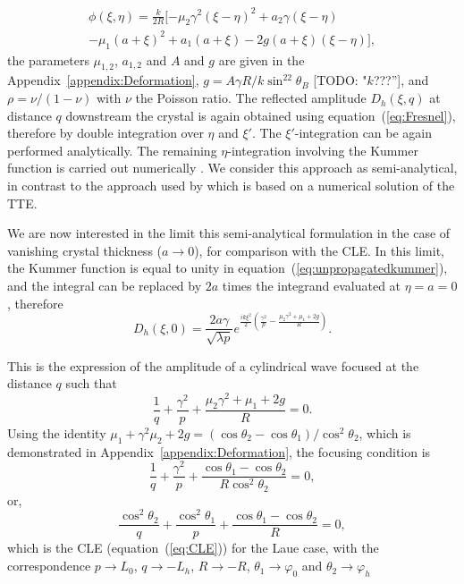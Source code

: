 \documentclass[preprint]{iucr}              %
\newcommand{\todo}[1]{{\color{red}[TODO: "#1'']}}
\newcommand{\inred}[1]{{\color{red}#1}}
\begin{document}
\begin{multline}
    \phi(\xi,\eta) =\frac{k}{2R}[-\mu_2\gamma^2(\xi-\eta)^2
    +a_2\gamma(\xi-\eta) \\
    -\mu_1(a+\xi)^2 
    +a_1(a+\xi)
    -2g(a+\xi)(\xi-\eta)],
\end{multline}
the parameters $\mu_{1,2}$, $a_{1,2}$ and $A$ \inred{and $g$} are given in the Appendix~\ref{appendix:Deformation},
\inred{$g=A\gamma R/ k \sin^22\theta_B$  \todo{$k$???}},
and $\rho=\nu/(1-\nu)$ with $\nu$ the Poisson ratio.   
The reflected amplitude $D_h(\xi,q)$ at distance $q$ downstream the crystal is again obtained using equation~(\ref{eq:Fresnel}), therefore by double integration over $\eta$ and $\xi'$. The $\xi'$-integration can be again performed analytically. The remaining $\eta$-integration involving the Kummer function is carried out numerically \cite{GuigayFerrero2016}. We consider this approach as semi-analytical, in contrast to the approach used by \cite{Nesterets} which is based on a numerical solution of the TTE.

We are now interested in the limit this \inred{semi-analytical} formulation in the case of vanishing crystal thickness ($a\rightarrow0{}$), for comparison with the CLE. In this limit, the Kummer function is equal to unity in equation~(\ref{eq:unpropagatedkummer}), and the integral can be replaced by $2a$ times the integrand evaluated at $\eta=a=0$, therefore
\begin{equation}
\label{eq:14reduced}
    D_h(\xi,0) = \frac{2 a \gamma}{\sqrt{\lambda p}} e^{\frac{i k \xi^2}{2}(\frac{\gamma^2}{p}-\frac{\mu_2\gamma^2+\mu_1+2g}{R})}.
\end{equation}

This is the expression of the amplitude of a cylindrical wave focused at the distance $q$ such that
\begin{equation}
    \frac{1}{q}+\frac{\gamma^2}{p}+\frac{\mu_2\gamma^2+\mu_1+2g}{R}=0. 
\end{equation}
Using the identity $\mu_1+\gamma^2\mu_2+2g=(\cos\theta_2-\cos\theta_1)/\cos^2\theta_2$, which is demonstrated in Appendix~\ref{appendix:Deformation}, the focusing condition is 
\begin{equation}
    \frac{1}{q}+\frac{\gamma^2}{p}+\frac{\cos\theta_1-\cos\theta_2}{R\cos^2\theta_2}=0,
\end{equation}
or,
\begin{equation}
    \frac{\cos^2\theta_2}{q}+\frac{\cos^2\theta_1}{p}+\frac{\cos\theta_1-\cos\theta_2}{R}=0,
\end{equation}
which is the CLE (equation~(\ref{eq:CLE})) for the Laue case, with the correspondence $p \rightarrow L_0$, $q \rightarrow -L_h$, $R \rightarrow -R$, $\theta_1 \rightarrow \varphi_0$ and $\theta_2 \rightarrow \varphi_h$
\end{document}
